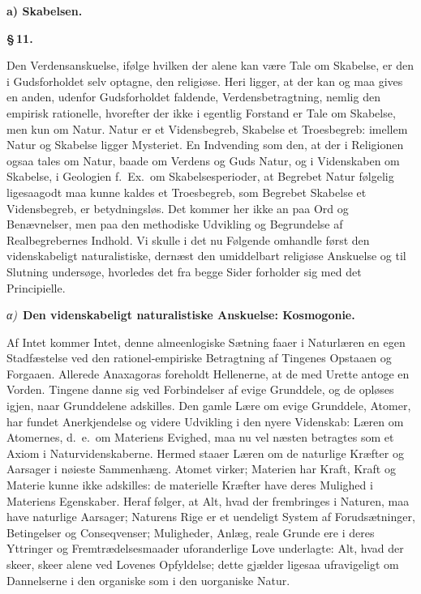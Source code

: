 \documentclass[12pt]{book}
\newcommand{\parmark}[1]{\begin{center}{\bfseries \S\,#1.}\end{center}}
\newcommand{\runhead}[1]{%
  \medskip\begin{center}{\bfseries #1}\end{center}\medskip}
\newcommand{\greekrun}[2]{%
  \medskip\begin{center}{\itshape #1)}\ {\bfseries #2}\end{center}\medskip}
\begin{document}
\runhead{a) Skabelsen.}
\parmark{11}

Den Verdensanskuelse, ifølge hvilken der alene kan være Tale om
Skabelse, er den i Gudsforholdet selv optagne, den religiøse. Heri
ligger, at der kan og maa gives en anden, udenfor Gudsforholdet
faldende, Verdensbetragtning, nemlig den empirisk rationelle,
hvorefter der ikke i egentlig Forstand er Tale om Skabelse, men kun
om Natur. Natur er et Vidensbegreb, Skabelse et Troesbegreb: imellem
Natur og Skabelse ligger Mysteriet. En
Indvending som den, at der i Religionen ogsaa tales om Natur, baade
om Verdens og Guds Natur, og i Videnskaben om Skabelse, i Geologien
f.\ Ex.\ om Skabelsesperioder, at Begrebet Natur følgelig ligesaagodt
maa kunne kaldes et Troesbegreb, som Begrebet Skabelse et
Vidensbegreb, er betydningsløs. Det kommer her ikke an paa Ord og
Benævnelser, men paa den methodiske Udvikling og Begrundelse af
Realbegrebernes Indhold. Vi skulle i det nu Følgende omhandle først
den videnskabeligt naturalistiske, dernæst den umiddelbart religiøse
Anskuelse og til Slutning undersøge, hvorledes det fra begge Sider
forholder sig med det Principielle.

\greekrun{α}{Den videnskabeligt naturalistiske Anskuelse: Kosmogonie.}

Af Intet kommer Intet, denne almeenlogiske Sætning faaer i
Naturlæren en egen Stadfæstelse ved den rationel-empiriske
Betragtning af Tingenes Opstaaen og Forgaaen. Allerede Anaxagoras
foreholdt Hellenerne, at de med Urette antoge en Vorden. Tingene
danne sig ved Forbindelser af evige Grunddele, og de opløses igjen,
naar Grunddelene adskilles. Den gamle Lære om evige Grunddele,
Atomer, har fundet Anerkjendelse og videre Udvikling i den nyere
Videnskab: Læren om Atomernes, d.\ e.\ om Materiens Evighed, maa nu
vel næsten betragtes som et Axiom i Naturvidenskaberne. Hermed
staaer Læren om de naturlige Kræfter og Aarsager i nøieste
Sammenhæng. Atomet virker; Materien har Kraft, Kraft og Materie
kunne ikke adskilles: de materielle Kræfter have deres Mulighed i
Materiens Egenskaber. Heraf følger, at Alt, hvad der frembringes i
Naturen, maa have naturlige Aarsager; Naturens Rige er et uendeligt
System af Forudsætninger, Betingelser og Conseqvenser; Muligheder,
Anlæg, reale Grunde ere i deres Yttringer og Fremtrædelsesmaader
uforanderlige Love underlagte: Alt, hvad
der skeer, skeer alene ved Lovenes Opfyldelse; dette gjælder ligesaa
ufravigeligt om Dannelserne i den organiske som i den uorganiske
Natur.
\end{document}

